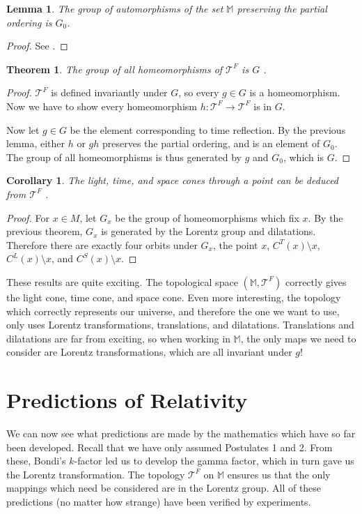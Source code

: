 \documentclass[12pt]{article}
\newtheorem{thm}{Theorem}
\newtheorem{cor}{Corollary}
\newtheorem{lem}{Lemma}
\theoremstyle{defn}
\theoremstyle{pf}
\newcommand{\M}{\mathbb{M}}
\newcommand{\0}{\emptyset}
\renewcommand{\-}{\setminus}
\begin{document}
\begin{lem}
 The group of automorphisms of the set $\M$ preserving the partial ordering is $G_0$.
\end{lem}
\begin{proof}
 See \cite{zeeman2}.
\end{proof}


\begin{thm}\label{1}The group of all homeomorphisms of $\mathcal{T}^F$ is $G$ \cite{zeeman}.
\end{thm}
\begin{proof}
$\mathcal{T}^F$ is defined invariantly under $G$, so every $g\in G$ is a homeomorphism. Now we have to show every homeomorphism $h:\mathcal{T}^F\rightarrow \mathcal{T}^F$ is in $G$.

Now let $g\in G$ be the element corresponding to time reflection. By the previous lemma, either $h$ or $gh$ preserves the partial ordering, and is an element of $G_0$. The group of all homeomorphisms is thus generated by $g$ and $G_0$, which is $G$.
\end{proof}

\begin{cor}\label{2}
 The light, time, and space cones through a point can be deduced from $\mathcal{T}^F$ \cite{zeeman}.
\end{cor}
\begin{proof}
 For $x\in M$, let $G_x$ be the group of homeomorphisms which fix $x$. By the previous theorem, $G_x$ is generated by the Lorentz group and dilatations. Therefore there are exactly four orbits under $G_x$, the point $x$, $C^T(x)\setminus x$, $C^L(x)\setminus x$, and $C^S(x)\setminus x$.
\end{proof}

These results are quite exciting. The topological space $\left(\M,\mathcal{T}^F\right)$ correctly gives the light cone, time cone, and space cone. Even more interesting, the topology which correctly represents our universe, and therefore the one we want to use, only uses Lorentz transformations, translations, and dilatations. Translations and dilatations are far from exciting, so when working in $\M$, the only maps we need to consider are Lorentz transformations, which are all invariant under $g$!

\section{Predictions of Relativity}
We can now see what predictions are made by the mathematics which have so far been developed. Recall that we have only assumed Postulates 1 and 2. From these, Bondi's $k$-factor led us to develop the gamma factor, which in turn gave us the Lorentz transformation. The topology $\mathcal{T}^F$ on $\M$ ensures us that the only mappings which need be considered are in the Lorentz group. All of these predictions (no matter how strange) have been verified by experiments.
\end{document}
